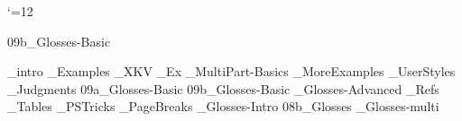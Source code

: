 


 \catcode`\@=12







%




\get 09b_Glosses-Basic  \bye

_intro
_Examples
_XKV
_Ex
_MultiPart-Basics
_MoreExamples
_UserStyles
_Judgments
\get 09a_Glosses-Basic
\get 09b_Glosses-Basic
_Glosses-Advanced
_Refs
_Tables
_PSTricks
_PageBreaks
%
\bye
{}_Glosses-Intro
\get 08b_Glosses
_Glosses-multi

